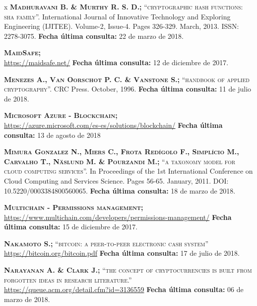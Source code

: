 \begin{thebibliography} {x}
	 \textsc{\textbf{Madhuravani B. \& Murthy R. S. D.; }}\textsc{“cryptographic hash functions: sha family”.} International Journal of Innovative Technology and Exploring Engineering (IJITEE). Volume-2, Issue-4. Pages 326-329. March, 2013. ISSN: 2278-3075.
	\newline \textbf{Fecha última consulta:} 22 de marzo de 2018.
	
	 \textsc{\textbf{MaidSafe; }} \\
	\url{https://maidsafe.net/}
	\newline \textbf{Fecha última consulta:} 12 de diciembre de 2017.
	
	 \textsc{\textbf{Menezes A., Van Oorschot P. C. \& Vanstone S.; }} \textsc{“handbook of applied cryptography”.} CRC Press. October, 1996.
	\newline \textbf{Fecha última consulta:} 11 de julio de 2018.
	
	 \textsc{\textbf{Microsoft Azure - Blockchain; }} \\ 
	\url{https://azure.microsoft.com/es-es/solutions/blockchain/} 
	\newline \textbf{Fecha última consulta:} 13 de agosto de 2018
		
	 \textsc{\textbf{Mimura Gonzalez N., Miers C., Frota Redígolo F., Simplício M., Carvalho T., Näslund M. \& Pourzandi M.; }}\textsc{“a taxonomy model for cloud computing services”.} In Proceedings of the 1st International Conference on Cloud Computing and Services Science. Pages 56-65. January, 2011. DOI: 10.5220/0003384800560065.
	\newline \textbf{Fecha última consulta:} 18 de marzo de 2018.
		
	 \textsc{\textbf{Multichain - Permissions management; }} \\ 
	\url{https://www.multichain.com/developers/permissions-management/} 
	\newline \textbf{Fecha última consulta:} 15 de diciembre de 2017.
	
	 \textsc{\textbf{Nakamoto S.; }}\textsc{“bitcoin: a peer-to-peer electronic cash system”} \\ 
	\url{https://bitcoin.org/bitcoin.pdf}
	\newline \textbf{Fecha última consulta:} 17 de julio de 2018.
	
	 \textsc{\textbf{Narayanan A. \& Clark J.; }}\textsc{“the concept of cryptocurrencies is built from forgotten ideas in research literature.”} \\
	\url{https://queue.acm.org/detail.cfm?id=3136559}
	\newline \textbf{Fecha última consulta:} 06 de marzo de 2018.
	

\end{thebibliography}
